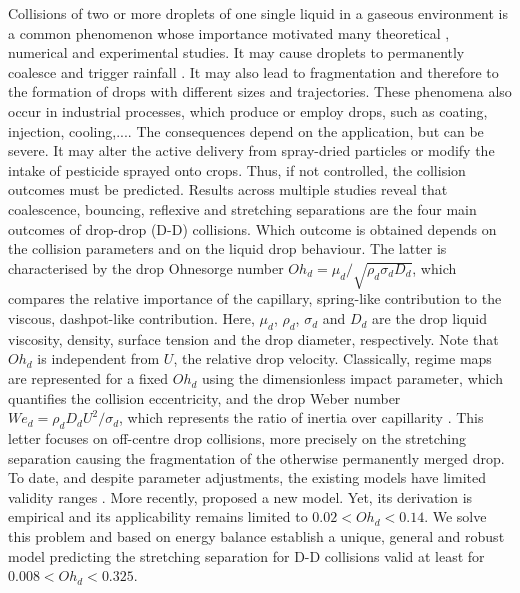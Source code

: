 \documentclass{article}
\begin{document}
Collisions of two or more droplets of one single liquid in a gaseous environment is a  common phenomenon whose importance {motivated} many theoretical \citep{ref:Roisman2009a, ref:Roisman2009b}, numerical \citep{ref:Sun2015, ref:Moqaddam2016, ref:Huang2019, ref:Li2016} and experimental \citep{ref:Brenn2001, ref:Brenn2006, ref:Pan2009} studies. It may cause droplets to {permanently} coalesce and trigger rainfall \citep{ref:Jayaratne1964}. {It may also lead to  fragmentation and therefore to the formation of drops with different sizes and trajectories. These phenomena also occur in industrial processes, which produce or employ drops, such as  coating, injection, cooling,...\citep{ref:Brenn1996}. }
 The consequences depend on the application, {but can be severe. It may alter the active delivery from spray-dried particles or modify the intake of pesticide sprayed onto crops.  Thus, if not controlled, the collision outcomes must be predicted. }Results across multiple studies reveal that coalescence, bouncing, reflexive and stretching separations are the four main outcomes of drop-drop (D-D) collisions. {Which outcome is obtained depends on the collision parameters and on the liquid drop behaviour. The latter is characterised by the drop Ohnesorge number $Oh_d=\mu_d/\sqrt{\rho_d \sigma_d D_d}$,  which compares the relative importance of the capillary, spring-like contribution to the viscous, dashpot-like contribution. Here, $\mu_d$, $\rho_d$, $\sigma_d$ and  $D_d$ are the drop liquid viscosity, density, surface tension and the drop diameter, respectively. Note that $Oh_d$ is independent from $U$, the relative drop velocity.  Classically, regime maps are  represented for a fixed $Oh_d$ using the dimensionless impact parameter, which quantifies the collision eccentricity, and the drop Weber number $We_d=\rho_d D_d U^2/\sigma_d$, which represents the ratio of inertia over capillarity \citep{ref:Ashgriz1990, ref:Jiang1992, ref:Qian1997, ref:Saroka2015}. This letter focuses on off-centre drop collisions{, more precisely on the stretching separation causing the fragmentation of the otherwise permanently merged drop}. To date, and despite parameter adjustments, the existing models have limited validity ranges \citep{ref:Pan2019, ref:Rabe2010,  ref:Gotaas2007, ref:Finotello2017}}. {More recently, \citet{al-dirawi_2021} proposed a new model. Yet, its derivation is empirical and its applicability remains limited to $0.02<Oh_d<0.14$.} We {solve this problem} and {based on energy balance} establish a {unique}, general and robust model predicting the stretching separation for D-D collisions {valid at least for  $0.008<Oh_d<0.325$}.
\end{document}
